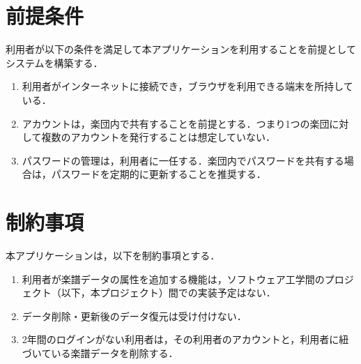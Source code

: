 \section{前提条件}
利用者が以下の条件を満足して本アプリケーションを利用することを前提としてシステムを構築する．
\begin{enumerate}
	\item 利用者がインターネットに接続でき，ブラウザを利用できる端末を所持している．
	\item アカウントは，楽団内で共有することを前提とする．つまり1つの楽団に対して複数のアカウントを発行することは想定していない．
	\item パスワードの管理は，利用者に一任する．楽団内でパスワードを共有する場合は，パスワードを定期的に更新することを推奨する．
\end{enumerate}
\section{制約事項}
本アプリケーションは，以下を制約事項とする．
\begin{enumerate}
	\item 利用者が楽譜データの属性を追加する機能は，ソフトウェア工学間のプロジェクト（以下，本プロジェクト）間での実装予定はない．
	\item データ削除・更新後のデータ復元は受け付けない．
	\item 2年間のログインがない利用者は，その利用者のアカウントと，利用者に紐づいている楽譜データを削除する．
\end{enumerate}